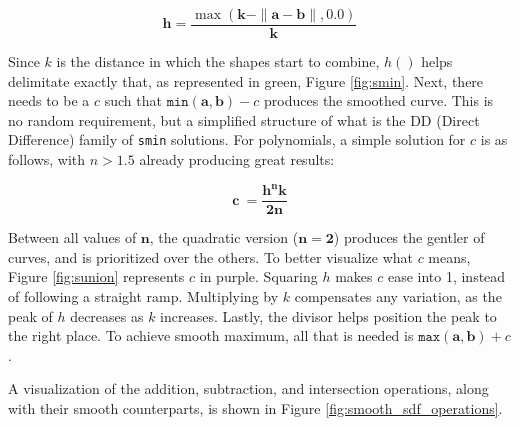 \begin{equation}
    \mathbf{h} = \frac{\max(\mathbf{k} - \|\mathbf{a} - \mathbf{b}\|, 0.0)}{\mathbf{k}}
    \label{eq:example_equation}
\end{equation}

Since $k$ is the distance in which the shapes start to combine, $h()$ helps delimitate exactly that, as represented in green, Figure \ref{fig:smin}. Next, there needs to be a $c$ such that $\texttt{min}{(\textbf{a},\textbf{b})-c}$ produces the smoothed curve. This is no random requirement, but a simplified structure of what is the DD (Direct Difference) family of \texttt{smin} solutions. For polynomials, a simple solution for $c$ is as follows, with $n>1.5$ already producing great results:

\begin{equation}
    \mathbf{c}\ =\frac{\mathbf{h}^{\mathbf{n}}\mathbf{k}}{\mathbf{2n}}
    \label{eq:example_equation_2}
\end{equation}

Between all values of $\mathbf{n}$, the quadratic version ($\mathbf{n=2}$) produces the gentler of curves, and is prioritized over the others. To better visualize what $c$ means, Figure \ref{fig:sunion} represents $c$ in purple. Squaring ${h}$ makes $c$ ease into 1, instead of following a straight ramp. Multiplying by $k$ compensates any variation, as the peak of ${h}$ decreases as $k$ increases. Lastly, the divisor helps position the peak to the right place.
To achieve smooth maximum, all that is needed is $\texttt{max}(\mathbf{a},\mathbf{b})+c$.

A visualization of the addition, subtraction, and intersection operations, along with their smooth counterparts, is shown in Figure \ref{fig:smooth_sdf_operations}.

